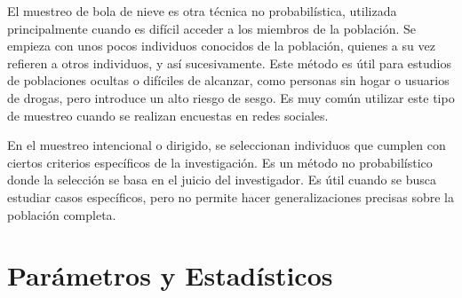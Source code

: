 \documentclass[
  letterpaper,
  DIV=11,
  numbers=noendperiod]{scrreprt}
\begin{document}
\begin{tcolorbox}[enhanced jigsaw, arc=.35mm, breakable, coltitle=black, left=2mm, opacityback=0, bottomtitle=1mm, colbacktitle=quarto-callout-note-color!10!white, title=\textcolor{quarto-callout-note-color}{\faInfo}\hspace{0.5em}{Muestreo de Bola de Nieve}, titlerule=0mm, colback=white, colframe=quarto-callout-note-color-frame, bottomrule=.15mm, rightrule=.15mm, opacitybacktitle=0.6, toptitle=1mm, toprule=.15mm, leftrule=.75mm]

El muestreo de bola de nieve es otra técnica no probabilística,
utilizada principalmente cuando es difícil acceder a los miembros de la
población. Se empieza con unos pocos individuos conocidos de la
población, quienes a su vez refieren a otros individuos, y así
sucesivamente. Este método es útil para estudios de poblaciones ocultas
o difíciles de alcanzar, como personas sin hogar o usuarios de drogas,
pero introduce un alto riesgo de sesgo. Es muy común utilizar este tipo
de muestreo cuando se realizan encuestas en redes sociales.

\end{tcolorbox}

\begin{tcolorbox}[enhanced jigsaw, arc=.35mm, breakable, coltitle=black, left=2mm, opacityback=0, bottomtitle=1mm, colbacktitle=quarto-callout-note-color!10!white, title=\textcolor{quarto-callout-note-color}{\faInfo}\hspace{0.5em}{Muestreo Intencional o Dirigido}, titlerule=0mm, colback=white, colframe=quarto-callout-note-color-frame, bottomrule=.15mm, rightrule=.15mm, opacitybacktitle=0.6, toptitle=1mm, toprule=.15mm, leftrule=.75mm]

En el muestreo intencional o dirigido, se seleccionan individuos que
cumplen con ciertos criterios específicos de la investigación. Es un
método no probabilístico donde la selección se basa en el juicio del
investigador. Es útil cuando se busca estudiar casos específicos, pero
no permite hacer generalizaciones precisas sobre la población completa.

\end{tcolorbox}

\hypertarget{paruxe1metros-y-estaduxedsticos}{%
\section{Parámetros y
Estadísticos}\label{paruxe1metros-y-estaduxedsticos}}
\end{document}
